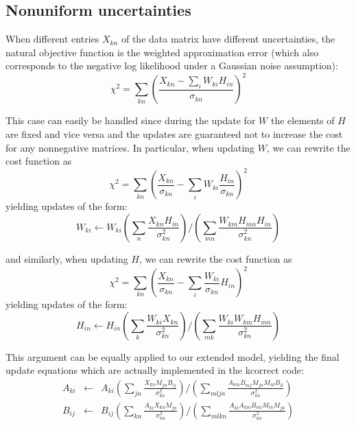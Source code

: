 \documentclass[12pt,preprint]{aastex}
\newcommand{\T}{^{\scriptscriptstyle \top}}
\newcommand{\XX}{X}
\newcommand{\XXt}{\tilde{X}}
\newcommand{\Xkn}{X_{kn}}
\newcommand{\WW}{W}
\newcommand{\WWt}{\tilde{W}}
\newcommand{\Wki}{W_{ki}}
\newcommand{\HH}{H}
\newcommand{\HHt}{\tilde{H}}
\newcommand{\Hin}{H_{in}}
\newcommand{\Aki}{A_{ki}}
\newcommand{\Bij}{B_{ij}}
\newcommand{\Mjn}{M_{jn}}
\newcommand{\skn}{\sigma_{kn}}
\begin{document}
\subsection{Nonuniform uncertainties}
When different entries $\Xkn$ of the data matrix have different
uncertainties, the natural objective function is the weighted approximation
error (which also corresponds to the negative log likelihood under a
Gaussian noise assumption):
\begin{equation}
\chi^2 = \sum_{kn} \left( \frac{\Xkn - 
\sum_i \Wki\Hin}{\skn}\right)^2
\end{equation}

This case can easily be handled since during the update for $\WW$ the
elements of $\HH$ are fixed and vice versa and the updates are
guaranteed not to increase the cost for any nonnegative matrices.
In particular, when updating $\WW$, we can rewrite the cost function as
\begin{equation}
\chi^2 = \sum_{kn} \left( \frac{\Xkn}{\skn} - 
\sum_i \Wki\frac{\Hin}{\skn}\right)^2
\end{equation}
yielding updates of the form:
\begin{equation}
\Wki \leftarrow \Wki 
\left( \sum_n \frac{\Xkn\Hin}{\skn^2} \right) / 
\left( \sum_{mn} \frac{W_{km}H_{mn}\Hin}{\skn^2}\right)
\end{equation}

and similarly, when updating $\HH$, we can rewrite the cost function as
\begin{equation}
\chi^2 = \sum_{kn} \left( \frac{\Xkn}{\skn} - 
\sum_i \frac{\Wki}{\skn}\Hin\right)^2
\end{equation}
yielding updates of the form:
\begin{equation}
\Hin \leftarrow \Hin
\left( \sum_k \frac{\Wki\Xkn}{\skn^2}\right) /
\left( \sum_{mk} \frac{\Wki{}W_{km}H_{mn}}{\skn^2}\right)
\end{equation}

This argument can be equally applied to our extended model, yielding
the final update equations which are actually implemented in the
kcorrect code:
\begin{eqnarray} 
\Aki &\leftarrow& \Aki 
\left( \sum_{jn} \frac{\Xkn\Mjn\Bij}{\skn^2}\right) / 
\left( \sum_{mljn} \frac{A_{km}B_{mj}M_{jn}M_{nl}B_{il}}{\skn^2}\right) \\
\Bij &\leftarrow& \Bij
\left( \sum_{kn} \frac{\Aki\Xkn\Mjn}{\skn^2}\right) / 
\left( \sum_{mlkn} \frac{A_{ki}A_{km}B_{ml}M_{ln}M_{jn}}{\skn^2}\right)
\end{eqnarray}
\end{document}
